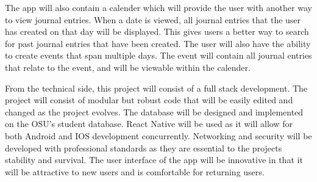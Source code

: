 \documentclass[letterpaper, 10, draftclsnofoot, onecolumn]{IEEEtran}
\begin{document}
The app will also contain a calender which will provide the user with another way to view journal entries. When a date is viewed, all journal entries that the user has created on that day will be displayed. 
This gives users a better way to search for past journal entries that have been created. The user will also have the ability to create events that span multiple days. The event will contain all journal entries that relate to the event, and will be viewable within the calender.   

 From the technical side, this project will consist of a full stack development. 
The project will consist of modular but robust code that will be easily edited 
and changed as the project evolves. The database will
be designed and implemented on the OSU's student database. React Native will be used
as it will allow for both Android and IOS development concurrently. Networking and
security will be developed with professional standards as they are essential to the
projects stability and survival. The user interface of the app will be innovative in that it will
be attractive to new users and is comfortable for returning users.
\end{document}
